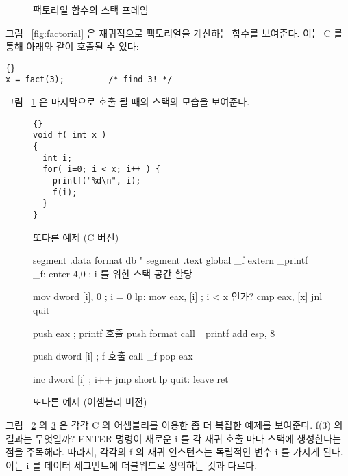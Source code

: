 \begin{figure}
\centering

\caption{팩토리얼 함수의 스택 프레임\label{fig:factStack}}
\end{figure}

그림 ~\ref{fig:factorial} 은 재귀적으로 팩토리얼을 계산하는 함수를 보여준다.
이는 C 를 통해 아래와 같이 호출될 수 있다:

\begin{lstlisting}[stepnumber=0]{}
x = fact(3);         /* find 3! */
\end{lstlisting}

그림 ~\ref{fig:factStack} 은 마지막으로 호출 될 때의 스택의 모습을 보여준다.

\begin{figure}[t]
\begin{lstlisting}[frame=tlrb]{}
void f( int x )
{
  int i;
  for( i=0; i < x; i++ ) {
    printf("%d\n", i);
    f(i);
  }
}
\end{lstlisting}
\caption{또다른 예제 (C 버전)\label{fig:rec2C}}
\end{figure}

\begin{figure}
\begin{AsmCodeListing}[frame=single]
segment .data
format       db "%
segment .text
      global _f
      extern _printf
_f:
      enter  4,0           ; i 를 위한 스택 공간 할당

      mov    dword [i], 0  ; i = 0
lp:
      mov    eax, [i]      ; i < x 인가?
      cmp    eax, [x]
      jnl    quit

      push   eax           ; printf 호출
      push   format
      call   _printf
      add    esp, 8

      push   dword [i]     ; f 호출
      call   _f
      pop    eax

      inc    dword [i]     ; i++
      jmp    short lp
quit:
      leave
      ret
\end{AsmCodeListing}
\caption{또다른 예제 (어셈블리 버전)\label{fig:rec2Asm}}
\end{figure}

그림 ~\ref{fig:rec2C} 와 \ref{fig:rec2Asm} 은 각각 C 와 어셈블리를 이용한
좀 더 복잡한 예제를 보여준다. {\code f(3)} 의 결과는 무엇일까? {\code ENTER} 명령이
새로운 {\code i} 를 각 재귀 호출 마다 스택에 생성한다는 점을 주목해라. 따라서, 각각의 
{\code f} 의 재귀 인스턴스는 독립적인 변수 {\code i} 를 가지게 된다. 이는 {\code i} 를 
{\code 데이터} 세그먼트에 더블워드로 정의하는 것과 다르다. 

